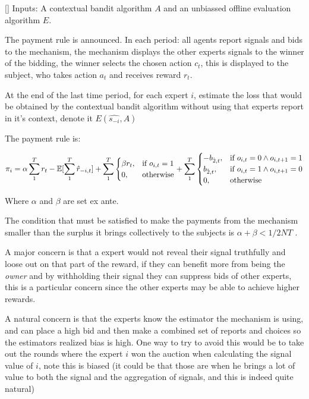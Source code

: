 \begin{mech}\label{mech:bidbandit}[]
Inputs: A contextual bandit algorithm $A$ and an unbiassed offline evaluation algorithm $E$.



The payment rule is announced.
 In each period: all agents report signals and bids to the mechanism, the mechanism displays the other experts signals to the winner of the bidding, the winner selects the chosen action $c_t$, this is displayed to the subject, who takes action $a_t$ and receives reward $r_t$.

At the end of the last time period, for each expert $i$, estimate the loss that would be obtained by the contextual bandit algorithm without using that experts report in it's context, denote it $E(\hat{s_{-i}},A)$



The payment rule is:

\[
    \pi_i = 
\alpha \sum_1^T r_t -  \expec[\sum_1^T \hat{r}_{-i,t}]
+
\sum_1^T
\begin{cases}
    \beta r_t ,& \text{if } o_{i,t} = 1\\
     0,              & \text{otherwise}
\end{cases}
+
\sum_1^T
\begin{cases}
     - b_{\hat{2},t} ,& \text{if } o_{i,t} = 0 \land o_{i,t+1} = 1\\
       b_{\hat{2},t} ,& \text{if } o_{i,t} = 1 \land o_{i,t+1} = 0 \\
	   0,              & \text{otherwise}
\end{cases}
\]

Where $\alpha$ and $\beta$ are set ex ante. 
\end{mech}


The condition that must be satisfied to make the payments from the mechanism smaller than the surplus it brings collectively to the subjects is $ \alpha + \beta < 1/2NT$ .



 A major concern is that a expert would not reveal their signal truthfully and loose out on that part of the reward, if they can benefit more from being the \emph{owner} and by withholding their signal they can suppress bids of other experts, this is a particular concern since the other experts may be able to achieve higher rewards.

A natural concern is that the experts know the estimator the mechanism is using, and can place a high bid and then make a combined set of reports and choices so the estimators realized bias is high.
One way to try to avoid this would be to take out the rounds where the expert $i$ won the auction when calculating the signal value of $i$, note this is biased (it could be that those are when he brings a lot of value to both the signal and the aggregation of signals, and this is indeed quite natural)






